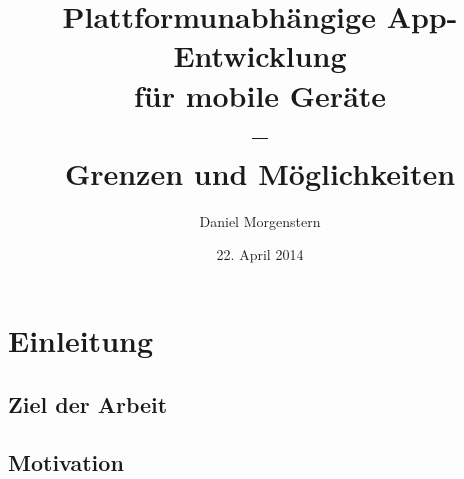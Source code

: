 \documentclass{scrreprt}
\title{Plattformunabhängige App-Entwicklung \\ für mobile Geräte \\--\\ Grenzen und Möglichkeiten}
\author{Daniel Morgenstern}
\date{22. April 2014}
\begin{document}
   \maketitle
   \tableofcontents
\chapter{Einleitung}
\section{Ziel der Arbeit}
\section{Motivation} %
\begin{comment}
Bei der Entwicklung mobiler Anwendungen steht - besonders im Consumer-Bereich - neben vielen anderen Entscheidungen die Wahl der Ziel-Plattform an, wobei ein wichtiger Faktor sicher die Erreichbarkeit einer möglichst großen Nutzer-Anzahl darstellt.
Vermutlich um den  Entwicklungsaufwand nicht ins Bodenlose \todo{Stil!} ausufern zu lassen beschränken sich dabei viele App-Hersteller (oder -anbieter) auf die größten, meist genutzten Plattformen wie Android oder iOS. \todo{darf man so eine Behauptung jetzt einfach machen? oder wie weißt man sowas nach?}

Doch nicht nur, dass dadurch doppelter Wartungs- und Anpassungsaufwand für die Entwicklung entsteht, auch werden dadurch viele andere Betriebssysteme vernachlässigt, was letztlich zu Lasten der Nutzer geht, die auf einem vielfältigen aber auch diffundierten Markt - je nach Hersteller und Plattform - ein zum Teil eingeschränktes und ungleich verteiltes Angebot an Anwendungen vorfinden. 

Auf der anderen Seite hat der Bereich der Webentwicklung und -gestaltung in den letzten Jahren seit Aufkommen von Smartphones und Tablets eine neue Anforderung hinzu bekommen: Websites müssen nicht mehr nur für die unterschiedlichsten Browser auf dem Desktop angepasst werden, sondern sollen sich auch auf Geräten, die für Touch-Bedienung ausgelegt sind unterschiedlicher Bildschirmgrößen gleich gut anfühlen und bedienen lassen. Da der Trend für viele Firmen in Sachen Öffentlichkeitsarbeit, Kundenbindung und -freundlichkeit neben der Firmen-Website und der eigenen Facebook-Seite auch eine eigene App zu fordern scheint, liegt vor dem zuvor genannten Hintergrund der stark variierenden App-Formate der Ansatz nahe, auch den Webbrowser als eine weitere Plattform im bunten Gefüge aus Deployment-Anforderungen zu sehen, die nach Verminderung und Zusammenführung des Entwicklungsaufwands im mobilen Bereich verlangt. 

Letzterer Ansatz ist allerdings nur einer, den es zu Untersuchen gilt; Zentraler Forschungsgegenstand soll die Exploration der Möglichkeiten und Grenzen der plattformunabhängigen App-Entwicklung anhand eines beispielhaft implementierten Anwendungsfalls sein.
\end{comment}
\end{document}
